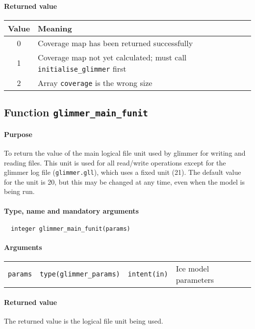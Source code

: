 \documentclass[11pt]{article}
\begin{document}
\paragraph{Returned value}
%
\begin{center}
\begin{tabular}{|c|l|}
\hline
Value & Meaning \\
\hline
\hline
0 & Coverage map has been returned successfully \\
1 & Coverage map not yet calculated; must call \texttt{initialise\_glimmer}
first \\
2 & Array \texttt{coverage} is the wrong size \\
\hline
\end{tabular}
\end{center}
%
\subsection{Function \texttt{glimmer\_main\_funit}}
%
\paragraph{Purpose}
%
To return the value of the main logical file unit used by glimmer for writing
and reading files. This unit is used for all read/write operations except for
the glimmer log file (\texttt{glimmer.gll}), which uses a fixed unit (21). The
default value for the unit is 20, but this may be changed at any time, even
when the model is being run.
%
\paragraph{Type, name and mandatory arguments}
%
\begin{verbatim}
  integer glimmer_main_funit(params)
\end{verbatim}
%
\paragraph{Arguments}
%
\begin{center}
\begin{tabular}{llll}
\texttt{params} & \texttt{type(glimmer\_params)} & \texttt{intent(in)} & Ice model parameters \\
\end{tabular}
\end{center}
%
\paragraph{Returned value}
%
The returned value is the logical file unit being used.
%
\end{document}
